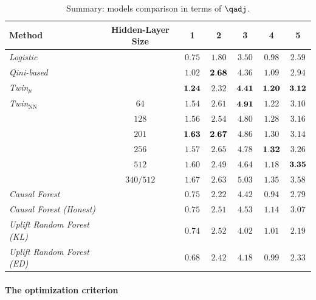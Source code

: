 \begin{table}[!ht]
    \centering
    \begin{tabular}{l|c|ccccc}
        \hline
        Method & Hidden-Layer Size & 1 & 2 & 3 & 4 & 5 \\
        \hline
        {\it Logistic} && $0.75$ & $1.80$  & $3.50$ & $0.98$ & $2.59$\\
        {\it Qini-based} && $1.02$ & $\bf2.68$ & $4.36$ & $1.09$ & $2.94$\\
        {\it Twin$_{\mu}$} && $\bf1.24$  & $2.32$ & $\bf4.41$ & $\bf1.20$ & $\bf3.12$\\
        \hline
        {\it Twin$_{\mathrm{NN}}$}
        & $64$  & $1.54$  & $2.61$ & $\bf 4.91$ & $1.22$ & $3.10$ \\
        & $128$ & $1.56$  & $2.54$ & $4.80$ & $1.28$ & $3.16$\\
        & $201$ & $\bf 1.63$ & $\bf 2.67$  & $4.86$ & $1.30$ & $3.14$\\
        & $256$ & $1.57$ & $2.65$ & $4.78$ & $\bf 1.32$ & $3.26$ \\
        & $512$ & $1.60$ & $2.49$ & $4.64$ & $1.18$ & $\bf 3.35$\\
        \hline
        & $340/512$ & $1.67$  & $2.63$ & $5.03$ & $1.35$ & $3.58$\\
        \hline
        {\it Causal Forest} & &$0.75$ & $2.22$ & $4.42$ & $0.94$ & $2.79$ \\
        {\it Causal Forest (Honest)} && $0.75$  & $2.51$ & $4.53$ & $1.14$ & $3.07$\\
        {\it Uplift Random Forest (KL)} && $0.74$ & $2.52$ & $4.02$ & $1.01$& $2.19$ \\
        {\it Uplift Random Forest (ED)} && $0.68$ & $2.42$ & $4.18$ & $0.99$ & $2.33$ \\
        \hline
    \end{tabular}
    \vspace{2mm}
    \caption{Summary: models comparison in terms of $\qadj$.}
    \label{tab:all_scenarios}
\end{table}


\paragraph{The optimization criterion}

